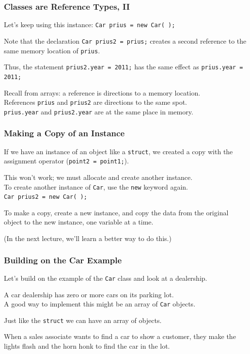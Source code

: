 \begin{frame}
\frametitle{Classes are Reference Types, II}
Let's keep using this instance: \texttt{Car prius = new Car( );}

Note that the declaration \texttt{Car prius2 = prius;} creates a second reference to the same memory location of \texttt{prius}.

Thus, the statement \texttt{prius2.year = 2011;} has the same effect as \texttt{prius.year = 2011;}

Recall from arrays: a reference is directions to a memory location.\\
\quad References \texttt{prius} and \texttt{prius2} are directions to the same spot.\\
\quad \texttt{prius.year} and \texttt{prius2.year} are at the same place in memory.

\end{frame}


\begin{frame}
\frametitle{Making a Copy of an Instance}

If we have an instance of an object like a \texttt{struct}, we created a copy with the assignment operator (\texttt{point2 = point1;}).

This won't work; we must allocate and create another instance.\\
\quad To create another instance of \texttt{Car}, use the \texttt{new} keyword again.\\
\quad \texttt{Car prius2 = new Car( );}

To make a copy, create a new instance, and copy the data from the original object to the new instance, one variable at a time.

(In the next lecture, we'll learn a better way to do this.)

\end{frame}

\begin{frame}
\frametitle{Building on the Car Example}

Let's build on the example of the \texttt{Car} class and look at a dealership.

A car dealership has zero or more cars on its parking lot.\\
\quad A good way to implement this might be an array of \texttt{Car} objects.

Just like the \texttt{struct} we can have an array of objects.

When a sales associate wants to find a car to show a customer, they make the lights flash and the horn honk to find the car in the lot.

\end{frame}

